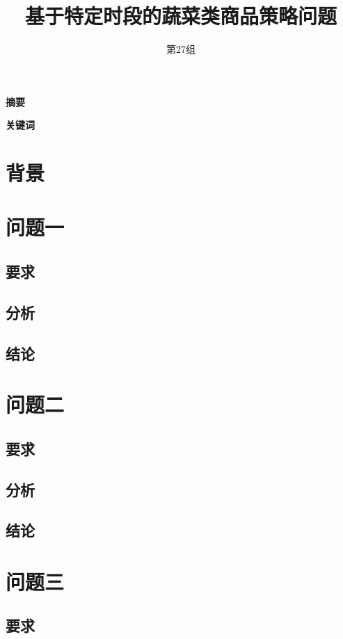 \documentclass{ctexart}
\title{\textbf{基于特定时段的蔬菜类商品策略问题}}
\author{第27组}
\begin{document}
\maketitle

\begin{center}
    \large\bfseries 摘要
\end{center}

\textbf{关键词}\qquad 
\newpage
\tableofcontents
\newpage

\section{背景}

\section{问题一}
\subsection{要求}
\subsection{分析}
\subsection{结论}

\section{问题二}
\subsection{要求}
\subsection{分析}
\subsection{结论}

\section{问题三}
\subsection{要求}
\end{document}
